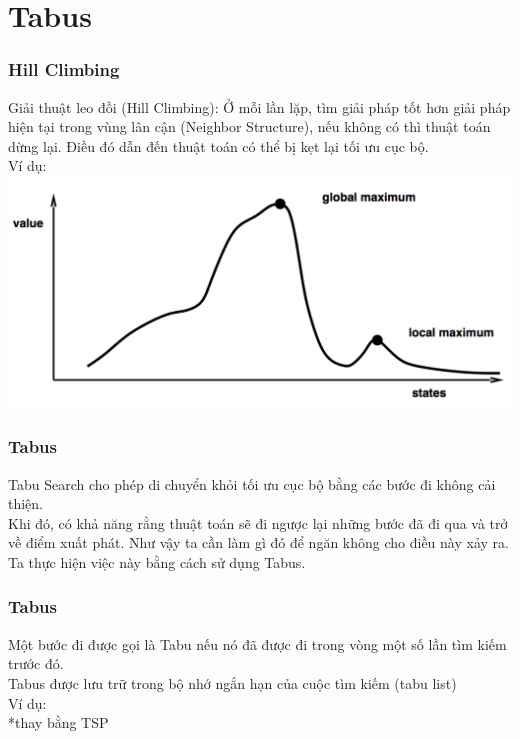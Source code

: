 \documentclass[12pt]{beamer}
\begin{document}
	\section{Tabus}
	\begin{frame}
		\frametitle{Hill Climbing}
		Giải thuật leo đồi (Hill Climbing): Ở mỗi lần lặp, tìm giải pháp tốt hơn giải pháp hiện tại trong vùng lân cận (Neighbor Structure), nếu không có thì thuật toán dừng lại. Điều đó dẫn đến thuật toán có thể bị kẹt lại tối ưu cục bộ.\\
		Ví dụ:\\
		\includegraphics[scale=0.4]{HillClimbing.png}\\
	\end{frame}

	\begin{frame}
		\frametitle{Tabus}
		Tabu Search cho phép di chuyển khỏi tối ưu cục bộ bằng các bước đi không cải thiện.\\
		Khi đó, có khả năng rằng thuật toán sẽ đi ngược lại những bước đã đi qua và trở về điểm xuất phát. Như vậy ta cần làm gì đó để ngăn không cho điều này xảy ra.\\
		Ta thực hiện việc này bằng cách sử dụng Tabus.
	\end{frame}

	\begin{frame}
		\frametitle{Tabus}
		Một bước đi được gọi là Tabu nếu nó đã được đi trong vòng một số lần tìm kiếm trước đó.\\
		Tabus được lưu trữ trong bộ nhớ ngắn hạn của cuộc tìm kiếm (tabu list)\\
		Ví dụ:\\
		*thay bằng TSP
	\end{frame}
	
\end{document}
